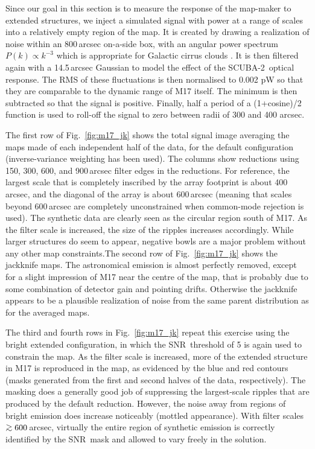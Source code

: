 \documentclass[useAMS,usenatbib,nofootinbib]{mn2e}
\newcommand{\snr}{SNR}
\newcommand{\scuba}{SCUBA-2}
\def\gsim{\mathrel{\lower2.5pt\vbox{\lineskip=0pt\baselineskip=0pt
          \hbox{$>$}\hbox{$\sim$}}}}
\begin{document}
Since our goal in this section is to measure the response of the
map-maker to extended structures, we inject a simulated signal with
power at a range of scales into a relatively empty region of the map.
It is created by drawing a realization of noise within an 800\,arcsec
on-a-side box, with an angular power spectrum $P(k) \propto k^{-3}$
which is appropriate for Galactic cirrus clouds
\citep[e.g.,][]{gautier1992}. It is then filtered again with a
14.5\,arcsec Gaussian to model the effect of the \scuba\ optical
response. The RMS of these fluctuations is then normalised to 0.002 pW
so that they are comparable to the dynamic range of M17 itself. The
minimum is then subtracted so that the signal is positive. Finally,
half a period of a (1+cosine)/2 function is used to roll-off the
signal to zero between radii of 300 and 400 arcsec.

The first row of Fig.~\ref{fig:m17_jk} shows the total signal image
averaging the maps made of each independent half of the data, for the
default configuration (inverse-variance weighting has been used). The
columns show reductions using 150, 300, 600, and 900\,arcsec filter
edges in the reductions. For reference, the largest scale that is
completely inscribed by the array footprint is about 400\,arcsec, and
the diagonal of the array is about 600\,arcsec (meaning that scales
beyond 600\,arcsec are completely unconstrained when common-mode
rejection is used).  The synthetic data are clearly seen as the
circular region south of M17. As the filter scale is increased, the
size of the ripples increases accordingly. While larger structures do
seem to appear, negative bowls are a major problem without any other
map constraints.The second row of Fig.~\ref{fig:m17_jk} shows the
jackknife maps. The astronomical emission is almost perfectly removed,
except for a slight impression of M17 near the centre of the map, that
is probably due to some combination of detector gain and pointing
drifts. Otherwise the jackknife appears to be a plausible realization
of noise from the same parent distribution as for the averaged maps.

The third and fourth rows in Fig.~\ref{fig:m17_jk} repeat this
exercise using the bright extended configuration, in which the \snr\
threshold of 5 is again used to constrain the map. As the filter scale
is increased, more of the extended structure in M17 is reproduced in
the map, as evidenced by the blue and red contours (masks generated
from the first and second halves of the data, respectively). The
masking does a generally good job of suppressing the largest-scale
ripples that are produced by the default reduction. However, the noise
away from regions of bright emission does increase noticeably (mottled
appearance). With filter scales $\gsim600$\,arcsec, virtually the
entire region of synthetic emission is correctly identified by the \snr\
mask and allowed to vary freely in the solution.
\end{document}
